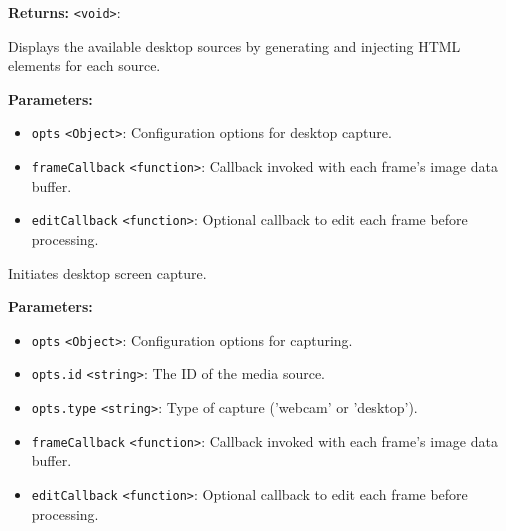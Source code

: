 \documentclass[12pt,a4paper]{article}
\begin{document}
\vspace{5mm}
\noindent {}


\noindent \textbf{Returns:} \texttt{<void>}:

\noindent Displays the available desktop sources by generating and injecting HTML elements for each source.

\vspace{5mm}
\noindent {}


\noindent \textbf{Parameters:}
\begin{itemize}
  \item \texttt{opts} \texttt{<Object>}: Configuration options for desktop capture.
  \item \texttt{frameCallback} \texttt{<function>}: Callback invoked with each frame's image data buffer.
  \item \texttt{editCallback} \texttt{<function>}: Optional callback to edit each frame before processing.
\end{itemize}

\noindent Initiates desktop screen capture.

\vspace{5mm}
\noindent {}


\noindent \textbf{Parameters:}
\begin{itemize}
  \item \texttt{opts} \texttt{<Object>}: Configuration options for capturing.
  \item \texttt{opts.id} \texttt{<string>}: The ID of the media source.
  \item \texttt{opts.type} \texttt{<string>}: Type of capture ('webcam' or 'desktop').
  \item \texttt{frameCallback} \texttt{<function>}: Callback invoked with each frame's image data buffer.
  \item \texttt{editCallback} \texttt{<function>}: Optional callback to edit each frame before processing.
\end{itemize}
\end{document}
